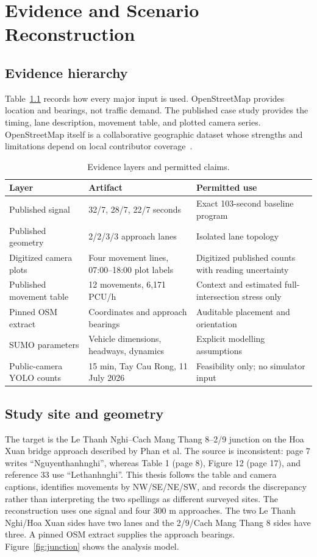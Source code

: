 \documentclass[12pt,a4paper]{report}
\begin{document}
\chapter{Evidence and Scenario Reconstruction}\label{ch:evidence}

\section{Evidence hierarchy}
Table~\ref{tab:evidence} records how every major input is used. OpenStreetMap provides location and bearings, not traffic demand. The published case study provides the timing, lane description, movement table, and plotted camera series. OpenStreetMap itself is a collaborative geographic dataset whose strengths and limitations depend on local contributor coverage~\cite{haklay2008osm}.

\begin{table}[H]
\centering
\caption{Evidence layers and permitted claims.}\label{tab:evidence}
\begin{tabular}{p{3.2cm}p{4.3cm}p{5.5cm}}
\toprule
Layer & Artifact & Permitted use \\
\midrule
Published signal & 32/7, 28/7, 22/7 seconds & Exact 103-second baseline program \\
Published geometry & 2/2/3/3 approach lanes & Isolated lane topology \\
Digitized camera plots & Four movement lines, 07:00--18:00 plot labels & Digitized published counts with reading uncertainty \\
Published movement table & 12 movements, 6,171 PCU/h & Context and estimated full-intersection stress only \\
Pinned OSM extract & Coordinates and approach bearings & Auditable placement and orientation \\
SUMO parameters & Vehicle dimensions, headways, dynamics & Explicit modelling assumptions \\
Public-camera YOLO counts & 15 min, Tay Cau Rong, 11 July 2026 & Feasibility only; no simulator input \\
\bottomrule
\end{tabular}
\end{table}

\section{Study site and geometry}
The target is the Le Thanh Nghi--Cach Mang Thang 8--2/9 junction on the Hoa Xuan bridge approach described by Phan et al. The source is inconsistent: page 7 writes ``Nguyenthanhnghi'', whereas Table 1 (page 8), Figure 12 (page 17), and reference 33 use ``Lethanhnghi''. This thesis follows the table and camera captions, identifies movements by NW/SE/NE/SW, and records the discrepancy rather than interpreting the two spellings as different surveyed sites. The reconstruction uses one signal and four 300 m approaches. The two Le Thanh Nghi/Hoa Xuan sides have two lanes and the 2/9/Cach Mang Thang 8 sides have three. A pinned OSM extract supplies the approach bearings. Figure~\ref{fig:junction} shows the analysis model.
\end{document}

